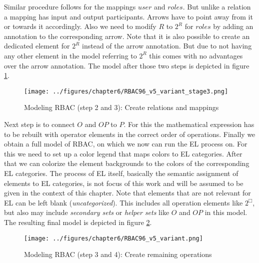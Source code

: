 \documentclass[twoside, openright, 12pt]{book}
\begin{document}
%
Similar procedure follows for the mappings $user$ and $roles$.
But unlike a relation a mapping has input and output participants.
Arrows have to point away from it or towards it accordingly.
Also we need to modify $R$ to $2^R$ for $roles$ by adding an annotation to the corresponding arrow.
Note that it is also possible to create an dedicated element for $2^R$ instead of the arrow annotation.
But due to not having any other element in the model referring to $2^R$ this comes with no advantages over the arrow annotation.
The model after those two steps is depicted in figure \ref{fig:RBAC96_v5_variant_stage3}.

\begin{figure}[htb]
	\centering
	\texttt{[image: ../figures/chapter6/RBAC96\_v5\_variant\_stage3.png]}
	\caption{Modeling RBAC (step 2 and 3): Create relations and mappings}
	\label{fig:RBAC96_v5_variant_stage3}
\end{figure}

\noindent
Next step is to connect $O$ and $OP$ to $P$.
For this the mathematical expression has to be rebuilt with operator elements in the correct order of operations.
Finally we obtain a full model of RBAC, on which we now can run the EL process on.
For this we need to set up a color legend that maps colors to EL categories.
After that we can colorize the element backgrounds to the colors of the corresponding EL categories.
The process of EL itself, basically the semantic assignment of elements to EL categories, is not focus of this work and will be assumed to be given in the context of this chapter.
Note that elements that are not relevant for EL can be left blank (\textit{uncategorized}).
This includes all operation elements like $2^{\Box}$, but also may include \textit{secondary sets} or \textit{helper sets} like $O$ and $OP$ in this model.
The resulting final model is depicted in figure \ref{fig:RBAC96_v5_variant}.

\begin{figure}[htb]
	\centering
	\texttt{[image: ../figures/chapter6/RBAC96\_v5\_variant.png]}
	\caption{Modeling RBAC (step 3 and 4): Create remaining operations}
	\label{fig:RBAC96_v5_variant}
\end{figure}
\end{document}
